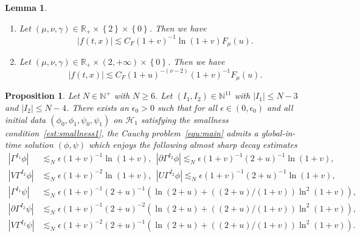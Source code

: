 \documentclass[10pt,a4paper]{amsart}
\newtheorem{lemma}{Lemma}
\newtheorem{proposition}{Proposition}
\def \R {{\mathbb{R} }}
\begin{document}
\begin{lemma}
\begin{enumerate}
\begin{enumerate}
		\item [\emph{(c)}] 
        Let $(\mu,\nu,\gamma)\in \R_{+}\times \left\{2\right\}\times \left\{0\right\}$.
        Then we have 
		\begin{equation*}
		|f(t,x)|\lesssim C_{F}(1+v)^{-1}\ln (1+v)F_{\mu}(u).
		\end{equation*}
		
		\item [\emph{(d)}]
        Let $(\mu,\nu,\gamma)\in \mathbb{R}_{+}\times (2,+\infty)\times \left\{0\right\}$.
        Then we have 
		\begin{equation*}
		|f(t,x)|\lesssim C_{F}(1+u)^{-(\nu-2)}(1+v)^{-1}F_{\mu}(u).
		\end{equation*}
\end{enumerate}
 
 \end{enumerate}
 \end{lemma}

\begin{proposition}\label{prop:existence}
 Let $N\in \mathbb{N}^{+}$ with $N\ge 6$.
 Let $(I_{1},I_{2})\in \mathbb{N}^{11}$ with $|I_{1}|\le N-3$ and $|I_{2}|\le N-4$.
 There exists an $\epsilon_{0}>0$ such that for all $\epsilon\in (0,\epsilon_{0})$ and all initial data $(\phi_{0},\phi_1,\psi_{0},\psi_1)$ on $\mathcal{H}_{1}$ satisfying the smallness condition~\eqref{est:smallness1}, 
 the Cauchy problem~\eqref{equ:main} admits a global-in-time solution $(\phi,\psi)$ which enjoys the following almost sharp decay estimates 
 \begin{equation*}
 \begin{aligned}
\left|\Gamma^{I_{1}}\phi\right|&\lesssim_{N} \epsilon (1+v)^{-1}\ln(1+v), \ \
\left|\partial\Gamma^{I_{2}}\phi\right|\lesssim_{N} \epsilon (1+v)^{-1}(2+u)^{-1}\ln (1+v),\\
\left|V\Gamma^{I_{2}}\phi\right|&\lesssim_{N}\epsilon (1+v)^{-2}\ln (1+v),\ \
\left|U\Gamma^{I_{2}}\phi\right|\lesssim_{N} \epsilon (1+v)^{-1}(2+u)^{-1}\ln (1+v),\\
\left|\Gamma^{I_{1}}\psi\right|&\lesssim_{N} \epsilon  (1+v)^{-1}(2+u)^{-1}\left(\ln (2+u) + ((2+u)/(1+v))\ln^{2} (1+v)\right),\\
\left|\partial\Gamma^{I_{2}}\psi\right|&\lesssim_{N} \epsilon  (1+v)^{-1}(2+u)^{-2}\left(\ln (2+u) + ((2+u)/(1+v))\ln^{2} (1+v)\right),\\
\left|V\Gamma^{I_{2}}\psi\right|&\lesssim_{N} \epsilon  (1+v)^{-2}(2+u)^{-1}\left(\ln (2+u) + ((2+u)/(1+v))\ln^{2} (1+v)\right).
     \end{aligned}
 \end{equation*}
\end{proposition}
\end{document}

